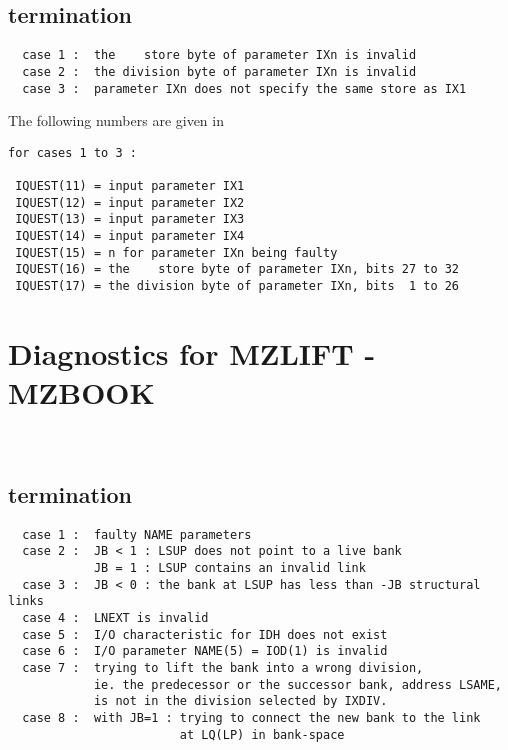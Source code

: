 
\subsection*{ termination}

\begin{verbatim}
  case 1 :  the    store byte of parameter IXn is invalid
  case 2 :  the division byte of parameter IXn is invalid
  case 3 :  parameter IXn does not specify the same store as IX1
\end{verbatim}

The following numbers are given in 

\begin{verbatim}
for cases 1 to 3 :

 IQUEST(11) = input parameter IX1
 IQUEST(12) = input parameter IX2
 IQUEST(13) = input parameter IX3
 IQUEST(14) = input parameter IX4
 IQUEST(15) = n for parameter IXn being faulty
 IQUEST(16) = the    store byte of parameter IXn, bits 27 to 32
 IQUEST(17) = the division byte of parameter IXn, bits  1 to 26
\end{verbatim}

\section{Diagnostics for MZLIFT - MZBOOK}

\begin{flushleft}
\\
\end{flushleft}

\subsection*{ termination}

\begin{verbatim}
  case 1 :  faulty NAME parameters
  case 2 :  JB < 1 : LSUP does not point to a live bank
            JB = 1 : LSUP contains an invalid link
  case 3 :  JB < 0 : the bank at LSUP has less than -JB structural links
  case 4 :  LNEXT is invalid
  case 5 :  I/O characteristic for IDH does not exist
  case 6 :  I/O parameter NAME(5) = IOD(1) is invalid
  case 7 :  trying to lift the bank into a wrong division,
            ie. the predecessor or the successor bank, address LSAME,
            is not in the division selected by IXDIV.
  case 8 :  with JB=1 : trying to connect the new bank to the link
                        at LQ(LP) in bank-space
\end{verbatim}

